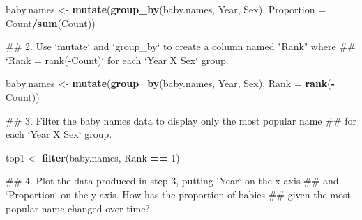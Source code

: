 \documentclass[]{book}
\newenvironment{Shaded}{\begin{snugshade}}{\end{snugshade}}
\newcommand{\KeywordTok}[1]{\textcolor[rgb]{0.13,0.29,0.53}{\textbf{#1}}}
\newcommand{\DataTypeTok}[1]{\textcolor[rgb]{0.13,0.29,0.53}{#1}}
\newcommand{\DecValTok}[1]{\textcolor[rgb]{0.00,0.00,0.81}{#1}}
\newcommand{\StringTok}[1]{\textcolor[rgb]{0.31,0.60,0.02}{#1}}
\newcommand{\OperatorTok}[1]{\textcolor[rgb]{0.81,0.36,0.00}{\textbf{#1}}}
\newcommand{\NormalTok}[1]{#1}
\begin{document}
\begin{Shaded}
\begin{Highlighting}[]
\NormalTok{baby.names <-}\StringTok{ }\KeywordTok{mutate}\NormalTok{(}\KeywordTok{group_by}\NormalTok{(baby.names, Year, Sex),}
                     \DataTypeTok{Proportion =}\NormalTok{ Count}\OperatorTok{/}\KeywordTok{sum}\NormalTok{(Count))}
\end{Highlighting}
\end{Shaded}

\begin{Shaded}
\begin{Highlighting}[]
\NormalTok{## 2.  Use `mutate` and `group_by` to create a column named "Rank" where }
\NormalTok{##     `Rank = rank(-Count)` for each `Year X Sex` group.}
\end{Highlighting}
\end{Shaded}

\begin{Shaded}
\begin{Highlighting}[]
\NormalTok{baby.names <-}\StringTok{ }\KeywordTok{mutate}\NormalTok{(}\KeywordTok{group_by}\NormalTok{(baby.names, Year, Sex),}
                     \DataTypeTok{Rank =} \KeywordTok{rank}\NormalTok{(}\OperatorTok{-}\NormalTok{Count))}
\end{Highlighting}
\end{Shaded}

\begin{Shaded}
\begin{Highlighting}[]
\NormalTok{## 3.  Filter the baby names data to display only the most popular name }
\NormalTok{##     for each `Year X Sex` group.}
\end{Highlighting}
\end{Shaded}

\begin{Shaded}
\begin{Highlighting}[]
\NormalTok{top1 <-}\StringTok{ }\KeywordTok{filter}\NormalTok{(baby.names, Rank }\OperatorTok{==}\StringTok{ }\DecValTok{1}\NormalTok{)}
\end{Highlighting}
\end{Shaded}

\begin{Shaded}
\begin{Highlighting}[]
\NormalTok{## 4. Plot the data produced in step 3, putting `Year` on the x-axis}
\NormalTok{##    and `Proportion` on the y-axis. How has the proportion of babies}
\NormalTok{##    given the most popular name changed over time?}
\end{Highlighting}
\end{Shaded}
\end{document}
